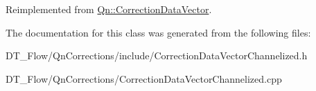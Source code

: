 Reimplemented from \mbox{\hyperlink{classQn_1_1CorrectionDataVector_a5fa5b765bd15afd5b5b7773ddb724e8e}{Qn\+::\+Correction\+Data\+Vector}}.



The documentation for this class was generated from the following files\+:\begin{DoxyCompactItemize}
\item 
D\+T\+\_\+\+Flow/\+Qn\+Corrections/include/Correction\+Data\+Vector\+Channelized.\+h\item 
D\+T\+\_\+\+Flow/\+Qn\+Corrections/Correction\+Data\+Vector\+Channelized.\+cpp\end{DoxyCompactItemize}
